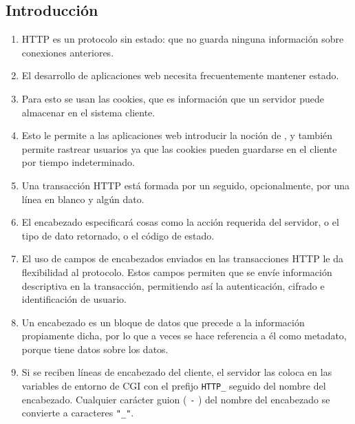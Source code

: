 \subsection{Introducción}

\begin{enumerate}
\item 
HTTP es un protocolo sin estado: que no guarda ninguna
información sobre conexiones anteriores. 

\item 
El desarrollo de aplicaciones
web necesita frecuentemente mantener estado. 

\item 
Para esto se usan las
cookies, que es información que un servidor puede almacenar en el
sistema cliente. 

\item 
Esto le permite a las aplicaciones web introducir
la noción de , y también permite rastrear usuarios ya que
las cookies pueden guardarse en el cliente por tiempo indeterminado.
\item
Una transacción HTTP está formada por un  seguido,
opcionalmente, por una línea en blanco y algún dato. 

\item 
El encabezado
especificará cosas como la acción requerida del servidor, o el tipo
de dato retornado, o el código de estado.
\item 
El uso de campos de encabezados enviados en las transacciones HTTP
le da flexibilidad al protocolo. Estos campos permiten que
se envíe información descriptiva en la transacción, permitiendo así
la autenticación, cifrado e identificación de usuario.
\item 
Un encabezado es un bloque de datos que precede a la información
propiamente dicha, por lo que a veces se hace referencia a él
como metadato, porque tiene datos sobre los datos.
\item 
Si se reciben líneas de encabezado del cliente, el servidor las
coloca en las variables de entorno de CGI con el prefijo \verb|HTTP_|
seguido del nombre del encabezado. Cualquier carácter guion ( \verb|-| )
del nombre del encabezado se convierte a caracteres \verb|"_"|.


\end{enumerate}
